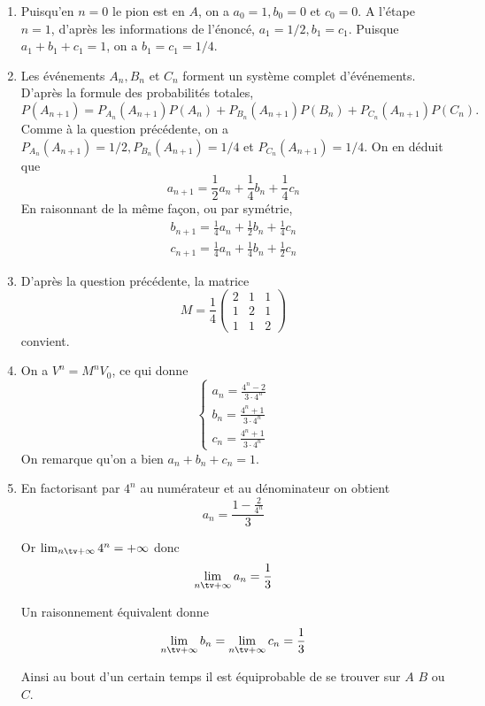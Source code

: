 \documentclass[a4paper, 11pt,reqno]{article}
\begin{document}
\begin{correction}
\begin{enumerate}


\item  Puisqu'en $n=0$ le pion est en $A$, on a $a_{0}=1, b_{0}=0$ et $c_{0}=0 .$ A l'étape $n=1$, d'après les informations de l'énoncé, $a_{1}=1 / 2, b_{1}=c_{1}$. Puisque $a_{1}+b_{1}+c_{1}=1$, on a $b_{1}=c_{1}=1 / 4$.
\item  Les événements $A_{n}, B_{n}$ et $C_{n}$ forment un système complet d'événements. D'après la formule des probabilités totales,
$$
P\left(A_{n+1}\right)=P_{A_{n}}\left(A_{n+1}\right) P\left(A_{n}\right)+P_{B_{n}}\left(A_{n+1}\right) P\left(B_{n}\right)+P_{C_{n}}\left(A_{n+1}\right) P\left(C_{n}\right) .
$$
Comme à la question précédente, on a $P_{A_{n}}\left(A_{n+1}\right)=1 / 2, P_{B_{n}}\left(A_{n+1}\right)=1 / 4$ et $P_{C_{n}}\left(A_{n+1}\right)=1 / 4$. On en déduit que
$$
a_{n+1}=\frac{1}{2} a_{n}+\frac{1}{4} b_{n}+\frac{1}{4} c_{n}
$$
En raisonnant de la même façon, ou par symétrie,
$$
\begin{gathered}
b_{n+1}=\frac{1}{4} a_{n}+\frac{1}{2} b_{n}+\frac{1}{4} c_{n} \\
c_{n+1}=\frac{1}{4} a_{n}+\frac{1}{4} b_{n}+\frac{1}{2} c_{n}
\end{gathered}
$$
\item  D'après la question précédente, la matrice
$$
M=\frac{1}{4}\left(\begin{array}{lll}
2 & 1 & 1 \\
1 & 2 & 1 \\
1 & 1 & 2
\end{array}\right)
$$
convient.
\item  On a $V^{n}=M^{n} V_{0}$, ce qui donne
$$
\left\{\begin{array}{l}
a_{n}=\frac{4^{n}-2}{3 \cdot 4^{n}} \\
b_{n}=\frac{4^{n}+1}{3 \cdot 4^{n}} \\
c_{n}=\frac{4^{n}+1}{3 \cdot 4^{n}}
\end{array}\right.
$$
On remarque qu'on a bien $a_{n}+b_{n}+c_{n}=1$.

\item En factorisant par $4^n$ au numérateur et au dénominateur  on obtient $$a_{n}=\frac{1-\frac{2}{4^n}}{3}$$

Or $\lim_{n\tv+\infty} 4^n=+\infty$ donc 
$$\lim_{n\tv+\infty} a_n =\frac{1}{3}$$

Un raisonnement équivalent donne 
$$\lim_{n\tv+\infty} b_n =\lim_{n\tv+\infty} c_n =\frac{1}{3} $$

Ainsi au bout d'un certain temps il est équiprobable de se trouver sur $A$ $B$ ou $C$. 



\end{enumerate}
\end{correction}
\end{document}
